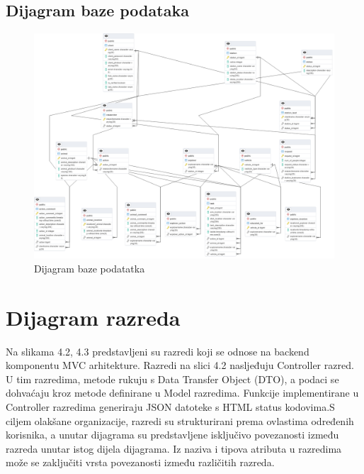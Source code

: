 			\subsection{Dijagram baze podataka}
				\begin{figure}[H]
					\includegraphics[width=\textwidth]{slike/dijagram_baze.PNG} %
					\caption{Dijagram baze podatatka}
					\label{fig:dijagram_baze} %
				\end{figure}
			
			\eject
			
			
		\section{Dijagram razreda}
		
			Na slikama 4.2, 4.3 predstavljeni su razredi koji se odnose na backend komponentu MVC arhitekture. Razredi na slici 4.2 nasljeđuju Controller razred. U tim razredima, metode rukuju s Data Transfer Object (DTO), a podaci se dohvaćaju kroz metode definirane u Model razredima. Funkcije implementirane u Controller razredima generiraju JSON datoteke s HTML status kodovima.S ciljem olakšane organizacije, razredi su strukturirani prema ovlastima određenih korisnika, a unutar dijagrama su predstavljene isključivo povezanosti između razreda unutar istog dijela dijagrama. Iz naziva i tipova atributa u razredima može se zaključiti vrsta povezanosti između različitih razreda.
			
			\vspace{90pt}
			
